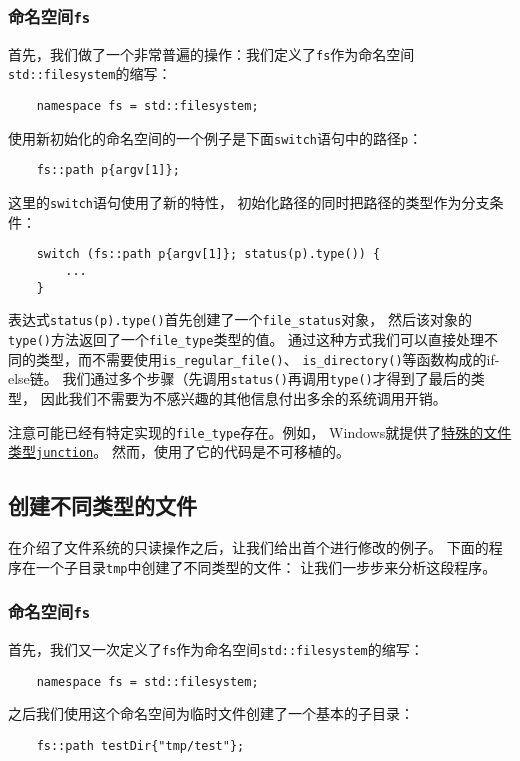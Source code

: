 \subsubsection{命名空间\texttt{fs}}
首先，我们做了一个非常普遍的操作：我们定义了\texttt{fs}作为命名空间
\texttt{std::filesystem}的缩写：
\begin{lstlisting}
    namespace fs = std::filesystem;
\end{lstlisting}
使用新初始化的命名空间的一个例子是下面\texttt{switch}语句中的路径\texttt{p}：
\begin{lstlisting}
    fs::path p{argv[1]};
\end{lstlisting}
这里的\texttt{switch}语句使用了新的特性，
初始化路径的同时把路径的类型作为分支条件：
\begin{lstlisting}
    switch (fs::path p{argv[1]}; status(p).type()) {
        ...
    }
\end{lstlisting}
表达式\texttt{status(p).type()}首先创建了一个\texttt{file\_status}对象，
然后该对象的\texttt{type()}方法返回了一个\texttt{file\_type}类型的值。
通过这种方式我们可以直接处理不同的类型，而不需要使用\texttt{is\_regular\_file()}、
\texttt{is\_directory()}等函数构成的if-else链。
我们通过多个步骤（先调用\texttt{status()}再调用\texttt{type()}才得到了最后的类型，
因此我们不需要为不感兴趣的其他信息付出多余的系统调用开销。

注意可能已经有特定实现的\texttt{file\_type}存在。例如，
Windows就提供了\hyperref[junction]{特殊的文件类型\texttt{junction}}。
然而，使用了它的代码是不可移植的。

\subsection{创建不同类型的文件}\label{ch20.1.3}
在介绍了文件系统的只读操作之后，让我们给出首个进行修改的例子。
下面的程序在一个子目录\texttt{tmp}中创建了不同类型的文件：
让我们一步步来分析这段程序。

\subsubsection{命名空间\texttt{fs}}
首先，我们又一次定义了\texttt{fs}作为命名空间\texttt{std::filesystem}的缩写：
\begin{lstlisting}
    namespace fs = std::filesystem;
\end{lstlisting}
之后我们使用这个命名空间为临时文件创建了一个基本的子目录：
\begin{lstlisting}
    fs::path testDir{"tmp/test"};
\end{lstlisting}

